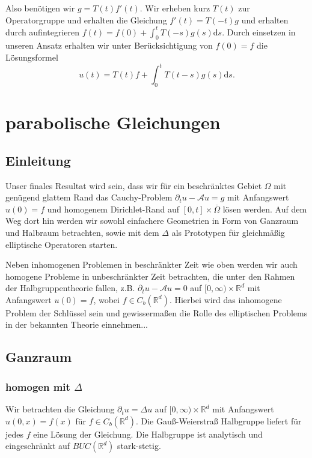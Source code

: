 \documentclass[11pt,a4paper]{scrartcl}
\newcommand{\R}{\mathbb{R}} %
\newcommand{\A}{\mathcal{A}}
\theoremstyle{plain}
\theoremstyle{definition}
\theoremstyle{remark}
\begin{document}
Also benötigen wir $g = T(t)f'(t)$. Wir erheben kurz $T(t)$ zur Operatorgruppe und erhalten die Gleichung $f'(t)=T(-t)g$ und erhalten durch aufintegrieren $f(t)=f(0)+\int_0^t T(-s)g(s) \mathrm{d}s$. Durch einsetzen in unseren Ansatz erhalten wir unter Berücksichtigung von $f(0)=f$ die Lösungsformel $$u(t)=T(t)f+\int_0^t T(t-s)g(s) \mathrm{d}s.$$

\section{parabolische Gleichungen}

\subsection{Einleitung}

Unser finales Resultat wird sein, dass wir für ein beschränktes Gebiet $\Omega$ mit genügend glattem Rand das Cauchy-Problem $\partial_t u - \A u = g$ mit Anfangswert $u(0)=f$ und homogenem Dirichlet-Rand auf $[0,t]\times \overline{\Omega}$ lösen werden. Auf dem Weg dort hin werden wir sowohl einfachere Geometrien in Form von Ganzraum und Halbraum betrachten, sowie mit dem $\Delta$ als Prototypen für gleichmäßig elliptische Operatoren starten.

Neben inhomogenen Problemen in beschränkter Zeit wie oben werden wir auch homogene Probleme in unbeschränkter Zeit betrachten, die unter den Rahmen der Halbgruppentheorie fallen, z.B. $\partial_t u - \A  u = 0$ auf $[0,\infty)\times \R^d$ mit Anfangswert $u(0)=f$, wobei $f\in C_b(\R^d)$. Hierbei wird das inhomogene Problem der Schlüssel sein und gewissermaßen die Rolle des elliptischen Problems in der bekannten Theorie einnehmen...

\subsection{Ganzraum}

\subsubsection{homogen mit $\Delta$}

Wir betrachten die Gleichung $\partial_t u = \Delta u$ auf $[0,\infty)\times \R^d$ mit Anfangswert $u(0,x)=f(x)$ für $f\in C_b(\R^d)$. Die Gauß-Weierstraß Halbgruppe liefert für jedes $f$ eine Lösung der Gleichung. Die Halbgruppe ist analytisch und eingeschränkt auf $BUC(\R^d)$ stark-stetig.
\end{document}
